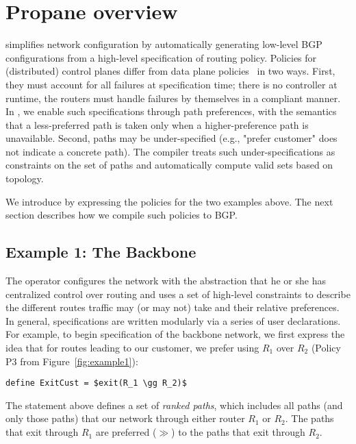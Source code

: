 \section{Propane overview}
\label{sec:propane}

\sysname simplifies network configuration by automatically generating low-level BGP configurations from a high-level specification of routing policy.
%
Policies for (distributed) control planes differ from data plane policies~\cite{x,y,z} in two ways. First, they must account for all failures at specification time; there is no controller at runtime, the routers must handle failures by themselves in a compliant manner.
%
In \sysname, we enable such specifications through path preferences, with the semantics that a less-preferred path is taken only when a higher-preference path is unavailable.
%
Second, paths may be under-specified (e.g., "prefer customer" does not indicate a concrete path). The \sysname compiler treats such under-specifications as constraints on the set of paths and automatically compute valid sets based on topology.




We introduce \sysname by expressing the policies for the two examples above.
%
The next section describes how we compile such policies to BGP.

\subsection{Example 1: The Backbone}


The operator configures the network with the abstraction that he or she has centralized control over routing and uses a set of high-level constraints to describe the different routes traffic may (or may not) take and their relative preferences.
In general, \sysname specifications are written modularly via a series
of user declarations.
For example, to begin specification of the backbone
network, we first express the idea that for routes leading to our customer,
we prefer using $R_1$ over $R_2$ (Policy P3 from Figure~\ref{fig:example1}):
\begin{lstlisting}[mathescape=true]
define ExitCust = $exit(R_1 \gg R_2)$
\end{lstlisting}
The  statement above defines a set of \emph{ranked paths}, which includes
all paths (and only those paths) that 
our network
through either router $R_1$ or $R_2$.  The paths that exit through $R_1$
are preferred ($\gg$) to the paths that exit through $R_2$.

